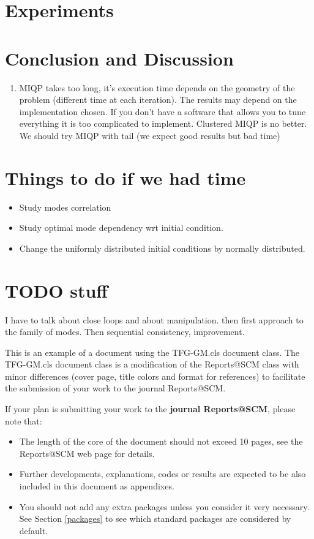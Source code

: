 \documentclass[12,twoside]{TFG-GM}
\theoremstyle{definition}
\theoremstyle{remark}
\begin{document}
\section{Experiments}
\label{sec:experiments}

\section{Conclusion and Discussion}
\label{sec:conclusion}
\begin{enumerate}
\item{MIQP} takes too long, it's execution time depends on the geometry of the problem (different time at each iteration). The results may depend on the implementation chosen. If you don't have a software that allows you to tune everything it is too complicated to implement. Clustered MIQP is no better. We should try MIQP with tail (we expect good results but bad time)
\end{enumerate}

\section{Things to do if we had time}
\label{sec:todo}
\begin{itemize}
\item Study modes correlation
\item Study optimal mode dependency wrt initial condition.
\item Change the uniformly distributed initial conditions by normally distributed.
\end{itemize}

\section{TODO stuff}
I have to talk about close loops and about manipulation. then first approach to the family of modes. Then sequential consistency, improvement.

This is an example of a document using the TFG-GM.cls document class. The TFG-GM.cls document class is a modification of the Reports@SCM class with minor differences (cover page, title colors and format for references) to facilitate the submission of your work to the journal Reports@SCM.

If your plan is submitting your work to the \textbf{journal Reports@SCM}, please note that:
\begin{itemize}
	\item The length of the core of the document should not exceed 10 pages, see the Reports@SCM web page for details.
	\item Further developments, explanations, codes or results are expected to be also included in this document as appendixes.
	\item You should not add any extra packages unless you consider it very necessary. See Section \ref{packages} to see which standard packages  are considered by default. 
\end{itemize} 
\end{document}
